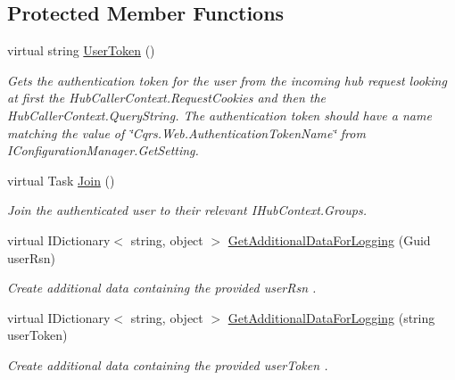 \subsection*{Protected Member Functions}
\begin{DoxyCompactItemize}
\item 
virtual string \hyperlink{classCqrs_1_1WebApi_1_1SignalR_1_1Hubs_1_1NotificationHub_a649436109e0060be9224aff8e75986b4_a649436109e0060be9224aff8e75986b4}{User\+Token} ()
\begin{DoxyCompactList}\small\item\em Gets the authentication token for the user from the incoming hub request looking at first the Hub\+Caller\+Context.\+Request\+Cookies and then the Hub\+Caller\+Context.\+Query\+String. The authentication token should have a name matching the value of \char`\"{}\+Cqrs.\+Web.\+Authentication\+Token\+Name\char`\"{} from I\+Configuration\+Manager.\+Get\+Setting. \end{DoxyCompactList}\item 
virtual Task \hyperlink{classCqrs_1_1WebApi_1_1SignalR_1_1Hubs_1_1NotificationHub_ae5915026e53a6d7b9929f703688ce90c_ae5915026e53a6d7b9929f703688ce90c}{Join} ()
\begin{DoxyCompactList}\small\item\em Join the authenticated user to their relevant I\+Hub\+Context.\+Groups. \end{DoxyCompactList}\item 
virtual I\+Dictionary$<$ string, object $>$ \hyperlink{classCqrs_1_1WebApi_1_1SignalR_1_1Hubs_1_1NotificationHub_a4b662758eb3732be37b9702c8d4e1791_a4b662758eb3732be37b9702c8d4e1791}{Get\+Additional\+Data\+For\+Logging} (Guid user\+Rsn)
\begin{DoxyCompactList}\small\item\em Create additional data containing the provided {\itshape user\+Rsn} . \end{DoxyCompactList}\item 
virtual I\+Dictionary$<$ string, object $>$ \hyperlink{classCqrs_1_1WebApi_1_1SignalR_1_1Hubs_1_1NotificationHub_a4c2512231d4ad5975fa584b14c2974c3_a4c2512231d4ad5975fa584b14c2974c3}{Get\+Additional\+Data\+For\+Logging} (string user\+Token)
\begin{DoxyCompactList}\small\item\em Create additional data containing the provided {\itshape user\+Token} . \end{DoxyCompactList}\end{DoxyCompactItemize}
